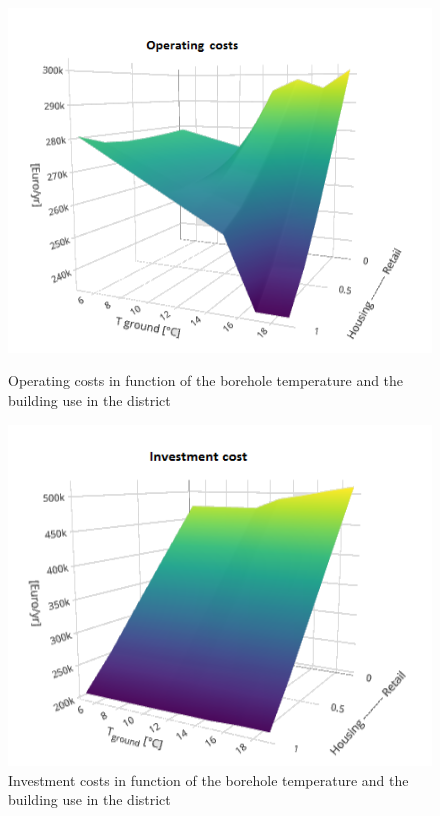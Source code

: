 \documentclass{article}
\begin{document}
\begin{figure}[!htb]
	\centering
	\begin{minipage}{.45\textwidth}
		\centering
		\includegraphics[width=\textwidth]{SA_CU_Tg_OC_py.png}
		\caption{Operating costs in function of the borehole temperature and the building use in the district}
		\label{fig:CU_Tg_OC}
	\end{minipage}%
	\hspace{1cm}
	\begin{minipage}{0.45\textwidth}
		\centering
		\includegraphics[width=\textwidth]{SA_CU_Tg_IC_py.png}
		\caption{Investment costs in function of the borehole temperature and the building use in the district}
		\label{fig:CU_Tg_IC}
	\end{minipage}
\end{figure}
\end{document}
